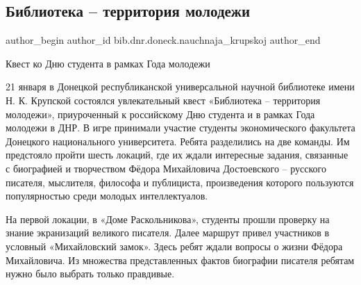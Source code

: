  
 
 
 
 

\subsection{Библиотека – территория молодежи}
\label{sec:21_01_2022.stz.bib.dnr.doneck.nauchnaja_krupskoj.1.kvest_den_studenta}
 
\ifcmt
 author_begin
   author_id bib.dnr.doneck.nauchnaja_krupskoj
 author_end
\fi

\begin{zznagolos}
Квест ко Дню студента в рамках Года молодежи
\end{zznagolos}

21 января в Донецкой республиканской универсальной научной библиотеке имени
Н. К. Крупской состоялся увлекательный квест «Библиотека – территория молодежи»,
приуроченный к российскому Дню студента и в рамках Года молодежи в ДНР. В игре
принимали участие студенты экономического факультета Донецкого национального
университета. Ребята разделились на две команды. Им предстояло пройти шесть
локаций, где их ждали интересные задания, связанные с биографией и творчеством
Фёдора Михайловича Достоевского – русского писателя, мыслителя, философа и
публициста, произведения которого пользуются популярностью среди молодых
интеллектуалов.


На первой локации, в «Доме Раскольникова», студенты прошли проверку на знание
экранизаций великого писателя. Далее маршрут привел участников в условный
«Михайловский замок». Здесь ребят ждали вопросы о жизни Фёдора Михайловича. Из
множества представленных фактов биографии писателя ребятам нужно было выбрать
только правдивые.


